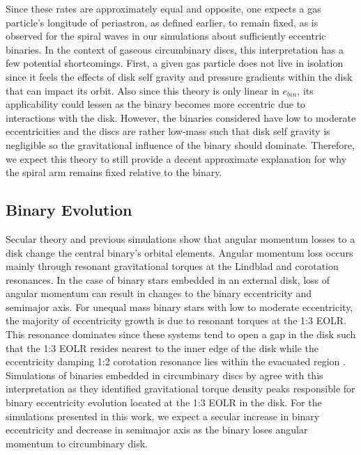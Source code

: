Since these rates are approximately equal and opposite, one expects a
gas particle's longitude of periastron, as defined earlier, to remain
fixed, as is observed for the spiral waves in our simulations about
sufficiently eccentric binaries.  In the context of gaseous circumbinary
discs, this interpretation has a few potential shortcomings.  First, a
given gas particle does not live in isolation since it feels the
effects of disk self gravity and pressure gradients within the disk that can impact its orbit.  Also since this theory is only linear in $e_{bin}$, its applicability could 
lessen as the binary becomes more eccentric due to interactions with the disk.  However, the binaries considered have low to moderate eccentricities and the 
discs are rather low-mass such that disk self gravity is negligible so the gravitational influence of the binary should dominate.  Therefore, we expect this 
theory to still provide a decent approximate explanation for why the spiral arm remains fixed relative to the binary.  
	

\subsection{Binary Evolution} \label{BinaryEvolution}

Secular theory \citep{Goldreich1979,Goldreich1980,Pringle91,Papaloizou01} and previous simulations \citep{Artymowicz1991,Cuadra2009,Roedig12,Dermine2013} show that angular 
momentum losses to a disk change the central binary's orbital elements.  Angular momentum loss occurs mainly through resonant gravitational torques 
at the Lindblad and corotation resonances.  In the case of binary stars embedded in an external disk, loss of angular momentum can result in changes to the 
binary eccentricity and semimajor axis.  For unequal mass binary stars with low to moderate eccentricity, the majority of eccentricity growth is due to resonant 
torques at the 1:3 EOLR.  This resonance dominates since these systems tend to open a gap in the disk such that the 1:3 EOLR resides nearest to the inner 
edge of the disk while the eccentricity damping 1:2 corotation resonance lies within the evacuated region \citep{Artymowicz1991,Artymowicz1992}.  Simulations of
binaries embedded in circumbinary discs by \citet{Roedig12} agree with this interpretation as they identified gravitational torque density peaks responsible for 
binary eccentricity evolution located at the 1:3 EOLR in the disk.  For the simulations presented in this work, we expect a secular increase in binary eccentricity 
and decrease in semimajor axis as the binary loses angular momentum to circumbinary disk.


